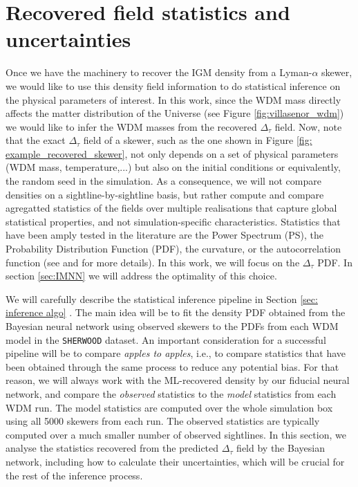 \section{Recovered field statistics and uncertainties}\label{sec:recovered statistics}
Once we have the machinery to recover the IGM density from a Lyman-$\alpha$ skewer, we would like to use this density field information to do statistical inference on the physical parameters of interest. In this work, since the WDM mass directly affects the matter distribution of the Universe (see Figure \ref{fig:villasenor_wdm}) we would like to infer the WDM masses from the recovered $\Delta_\tau$ field. Now, note that the exact $\Delta_\tau$ field of a skewer, such as the one shown in Figure \ref{fig: example_recovered_skewer}, not only depends on a set of physical parameters (WDM mass, temperature,...) but also on the initial conditions or equivalently, the random seed in the simulation. As a consequence, we will not compare densities on a sightline-by-sightline basis, but rather compute and compare agregatted statistics of the fields over multiple realisations that capture global statistical properties, and not simulation-specific characteristics. Statistics that have been amply tested in the literature are the Power Spectrum (PS), the Probability Distribution Function (PDF), the curvature, or the autocorrelation function (see \cite{Gaikwad_2021} and \cite{wolfson2023forecastingconstraintshighzigm} for more details). In this work, we will focus on the $\Delta_\tau$ PDF. In section \ref{sec:IMNN} we will address the optimality of this choice. 

We will carefully describe the statistical inference pipeline in Section \ref{sec: inference algo} . The main idea will be to fit the density PDF obtained from the Bayesian neural network using observed skewers to the PDFs from each WDM model in the \texttt{SHERWOOD} dataset. An important consideration for a successful pipeline will be to compare \emph{apples to apples}, i.e., to compare statistics that have been obtained through the same process to reduce any potential bias. For that reason, we will always work with the ML-recovered density by our fiducial neural network, and compare the \emph{observed} statistics to the \emph{model} statistics from each WDM run. The model statistics are computed over the whole simulation box using all 5000 skewers from each run. The observed statistics are typically computed over a much smaller number of observed sightlines. In this section, we analyse the statistics recovered from the predicted $\Delta_\tau$ field by the Bayesian network, including how to calculate their uncertainties, which will be crucial for the rest of the inference process.

